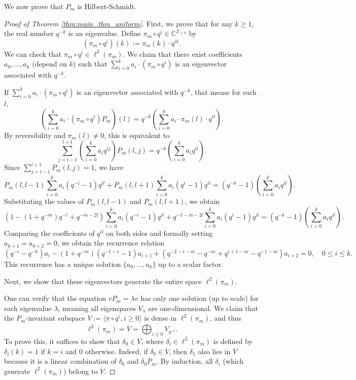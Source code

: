 \documentclass[a4]{amsart}
\theoremstyle{remark} \newtheorem{remark}[theorem]{Remark}
\begin{document}
\bigskip
We now prove that $P_m$ is Hilbert-Schmidt.

\begin{proof}[Proof of Theorem \ref{thm:main_thm_uniform}]
First, we prove that for any $k \geq 1$, the real number $q^{-k}$ is an eigenvalue. 
Define $\pi_m \circ q^i \in \mathbb{C}^{\mathbb{Z}_{\geq 0}}$ by
\[
(\pi_m \circ q^i)(k) := \pi_m(k) \cdot q^{ik}.
\]
We can check that $\pi_m \circ q^i \in \ell^2(\pi_m)$. 
We claim that there exist coefficients $a_0, \dots, a_k$ (depend on $k$) such that $\sum_{i=0}^{k} a_i \cdot (\pi_m \circ q^i)$ is an eigenvector associated with $q^{-k}$.

If $\sum_{i=0}^{k} a_i \cdot (\pi_m \circ q^i)$ is an eigenvector associated with $q^{-k}$, that means for each $l$,
\[
\left(\sum_{i=0}^{k} a_i \cdot (\pi_m \circ q^i) P_m\right)(l) = q^{-k} \left(\sum_{i=0}^{k} a_i \cdot \pi_m(l) \cdot q^{il}\right).
\]
By reversibility and $\pi_m(l)\neq 0$, this is equivalent to
\[
\sum_{j=l-1}^{l+1} \left(\sum_{i=0}^{k} a_i q^{ij}\right) P_m(l, j) = q^{-k} \left(\sum_{i=0}^{k} a_i q^{il}\right).
\]
Since $\sum_{j=l-1}^{l+1} P_m(l, j) = 1$, we have
\[
P_m(l, l-1) \sum_{i=0}^{k} a_i (q^{-i} - 1) q^{il} + P_m(l, l+1) \sum_{i=0}^{k} a_i (q^{i} - 1) q^{il} = (q^{-k} - 1) \left(\sum_{i=0}^{k} a_i q^{il}\right).
\]
Substituting the values of $P_m(l, l-1)$ and $P_m(l, l+1)$, we obtain
\[
\left(1 - (1 + q^{-m}) q^{-l} + q^{-m - 2l}\right) \sum_{i=0}^{k} a_i (q^{-i} - 1) q^{il} + q^{-1 - m - 2l} \sum_{i=0}^{k} a_i (q^{i} - 1) q^{il} = (q^{-k} - 1) \left(\sum_{i=0}^{k} a_i q^{il}\right).
\]
Comparing the coefficients of $q^{il}$ on both sides and formally setting $a_{k+1} = a_{k+2} = 0$, we obtain the recurrence relation
\[
(q^{-i} - q^{-k}) a_i - (1 + q^{-m}) (q^{-1 - i} - 1) a_{i+1} + (q^{-2 - i - m} - q^{-m} + q^{i + 1 - m} - q^{-1 - m}) a_{i+2} = 0, \quad 0 \leq i \leq k.
\]
This recurrence has a unique solution $\{a_0, \dots, a_k\}$ up to a scalar factor.

\bigskip
Next, we show that these eigenvectors generate the entire space $\ell^2(\pi_m)$.

\medskip
One can verify that the equation $v P_m = \lambda v$ has only one solution (up to scale) for each eigenvalue $\lambda$, meaning all eigenspaces $V_\lambda$ are one-dimensional. We claim that the $P_m$-invariant subspace $V := \langle \pi \circ q^i, i \geq 0 \rangle$ is dense in $\ell^2(\pi_m)$, and thus
\[
\ell^2(\pi_m) = \overline{V} = \overline{\bigoplus_{i \geq 0} V_{q^{-i}}}.
\]
To prove this, it suffices to show that $\delta_0 \in \overline{V}$, where $\delta_i \in \ell^2(\pi_m)$ is defined by $\delta_i(k) = 1$ if $k = i$ and $0$ otherwise.
Indeed, if $\delta_0 \in \overline{V}$, then $\delta_1$ also lies in $\overline{V}$ because it is a linear combination of $\delta_0$ and $\delta_0 P_m$. By induction, all $\delta_i$ (which generate $\ell^2(\pi_m)$) belong to $\overline{V}$.


\end{proof}
\end{document}
